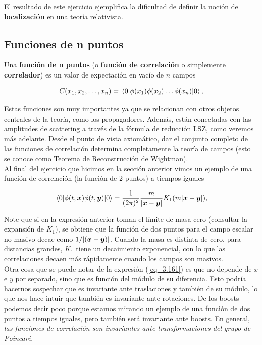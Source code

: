 El resultado de este ejercicio ejemplifica la dificultad de definir la noción de \textbf{localización} en una teoría relativista.\\

\subsection{Funciones de n puntos} 

Una \textbf{función de n puntos} (o \textbf{función de correlación}  o simplemente \textbf{correlador}) es un valor de expectación en vacío de $ n $ campos

\begin{equation}
	C(x_1,x_2,\ldots ,x_n) = \ev{\Ophi(x_1)\Ophi(x_2)\ldots \Ophi(x_n)}{0},
\end{equation}

Estas funciones son muy importantes ya que se relacionan con otros objetos centrales de la teoría, como los propagadores. Además, están conectadas con las amplitudes de scattering a través de la fórmula de reducción LSZ, como veremos más adelante. Desde el punto de vista axiomático, dar el conjunto completo de las funciones de correlación determina completamente la teoría de campos (esto se conoce como Teorema de Reconstrucción de Wightman).\\

Al final del ejercicio que hicimos en la sección anterior vimos un ejemplo de una función de correlación (la función de 2 puntos) a tiempos iguales

\begin{equation}
	\ev{\Ophi(t,\vb*{x})\Ophi(t,\vb*{y})}{0} = \frac{1}{(2\pi)^2} \frac{m}{\abs{\vb*{x}-\vb*{y}}} K_1 \qty( m\abs{\vb*{x}-\vb*{y}} ),
	\label{eq_3.161}
\end{equation}

 Note que si en la expresión anterior toman el límite de masa cero (consultar la expansión de $ K_1 $), se obtiene que la función de dos puntos para el campo escalar no masivo decae como $1/\abs{\qty(\vb*{x}-\vb*{y})}$.  Cuando la masa es distinta de cero, para distancias grandes, $ K_1 $ tiene un decaimiento exponencial, con lo que las correlaciones decaen más rápidamente cuando los campos son masivos.\\
 
 Otra cosa que se puede notar de la expresión (\ref{eq_3.161}) es que no depende de $ x $ e $ y $ por separado, sino que es función del módulo de su diferencia. Esto podría hacernos sospechar que es invariante ante traslaciones y también de su módulo, lo que nos hace intuir que también es invariante ante rotaciones. De los boosts podemos decir poco porque estamos mirando un ejemplo de una función de dos puntos a tiempos iguales, pero también será invariante ante boosts. En general, \emph{las funciones de correlación son invariantes ante transformaciones del grupo de Poincaré}.
 
 
 
 